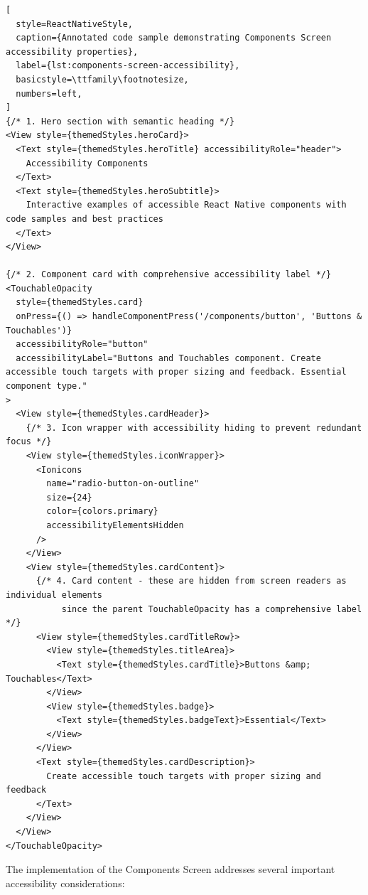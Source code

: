 \begin{lstlisting}[
  style=ReactNativeStyle,
  caption={Annotated code sample demonstrating Components Screen accessibility properties},
  label={lst:components-screen-accessibility},
  basicstyle=\ttfamily\footnotesize,
  numbers=left,
]
{/* 1. Hero section with semantic heading */}
<View style={themedStyles.heroCard}>
  <Text style={themedStyles.heroTitle} accessibilityRole="header">
    Accessibility Components
  </Text>
  <Text style={themedStyles.heroSubtitle}>
    Interactive examples of accessible React Native components with code samples and best practices
  </Text>
</View>

{/* 2. Component card with comprehensive accessibility label */}
<TouchableOpacity
  style={themedStyles.card}
  onPress={() => handleComponentPress('/components/button', 'Buttons & Touchables')}
  accessibilityRole="button"
  accessibilityLabel="Buttons and Touchables component. Create accessible touch targets with proper sizing and feedback. Essential component type."
>
  <View style={themedStyles.cardHeader}>
    {/* 3. Icon wrapper with accessibility hiding to prevent redundant focus */}
    <View style={themedStyles.iconWrapper}>
      <Ionicons
        name="radio-button-on-outline"
        size={24}
        color={colors.primary}
        accessibilityElementsHidden
      />
    </View>
    <View style={themedStyles.cardContent}>
      {/* 4. Card content - these are hidden from screen readers as individual elements
           since the parent TouchableOpacity has a comprehensive label */}
      <View style={themedStyles.cardTitleRow}>
        <View style={themedStyles.titleArea}>
          <Text style={themedStyles.cardTitle}>Buttons &amp; Touchables</Text>
        </View>
        <View style={themedStyles.badge}>
          <Text style={themedStyles.badgeText}>Essential</Text>
        </View>
      </View>
      <Text style={themedStyles.cardDescription}>
        Create accessible touch targets with proper sizing and feedback
      </Text>
    </View>
  </View>
</TouchableOpacity>
\end{lstlisting}

The implementation of the Components Screen addresses several important accessibility considerations:

